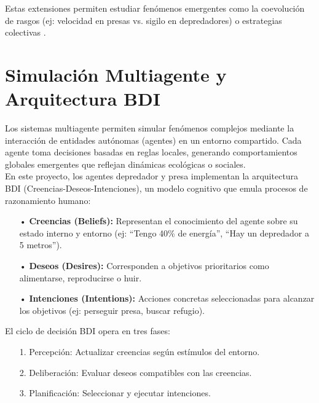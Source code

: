 \documentclass[letterpaper, 12pt]{report}
\begin{document}
Estas extensiones permiten estudiar fenómenos emergentes como la coevolución de rasgos (ej: velocidad en presas vs. sigilo en depredadores) o estrategias colectivas \cite{deangelis2005individual}.




\section{Simulación Multiagente y Arquitectura BDI}

Los sistemas multiagente permiten simular fenómenos complejos mediante la interacción de entidades autónomas (agentes) en un entorno compartido. Cada agente toma decisiones basadas en reglas locales, generando comportamientos globales emergentes que reflejan dinámicas ecológicas o sociales. \\

En este proyecto, los agentes depredador y presa implementan la arquitectura BDI (Creencias-Deseos-Intenciones), un modelo cognitivo que emula procesos de razonamiento humano:
\begin{itemize}

\item[•] \textbf{Creencias (Beliefs):} Representan el conocimiento del agente sobre su estado interno y entorno (ej: ``Tengo 40\% de energía'', ``Hay un depredador a 5 metros'').

\item[•] \textbf{Deseos (Desires):} Corresponden a objetivos prioritarios como alimentarse, reproducirse o huir.

\item[•] \textbf{Intenciones (Intentions):} Acciones concretas seleccionadas para alcanzar los objetivos (ej: perseguir presa, buscar refugio). \\
    
\end{itemize}

El ciclo de decisión BDI opera en tres fases:

\begin{itemize}
 \item[1.]   Percepción: Actualizar creencias según estímulos del entorno.

  \item[2.]  Deliberación: Evaluar deseos compatibles con las creencias.

  \item[3.]  Planificación: Seleccionar y ejecutar intenciones.
\end{itemize}
\end{document}
